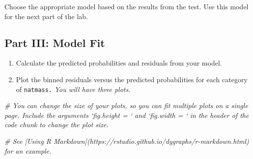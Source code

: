 \documentclass[]{book}
\newenvironment{Shaded}{\begin{snugshade}}{\end{snugshade}}
\newcommand{\CommentTok}[1]{\textcolor[rgb]{0.56,0.35,0.01}{\textit{#1}}}
\begin{document}
Choose the appropriate model based on the results from the test. Use
this model for the next part of the lab.

\subsection{Part III: Model Fit}\label{part-iii-model-fit}

\begin{enumerate}
\def\labelenumi{\arabic{enumi}.}
\setcounter{enumi}{10}
\item
  Calculate the predicted probabilities and residuals from your model.
\item
  Plot the binned residuals versus the predicted probabilities for each
  category of \texttt{natmass.} \emph{You will have three plots.}
\end{enumerate}

\begin{Shaded}
\begin{Highlighting}[]
\CommentTok{# You can change the size of your plots, so you can fit multiple plots on a single page. Include the arguments `fig.height = ` and `fig.width = ` in the header of the code chunk to change the plot size. }

\CommentTok{# See [Using R Markdown](https://rstudio.github.io/dygraphs/r-markdown.html) for an example.}
\end{Highlighting}
\end{Shaded}
\end{document}
